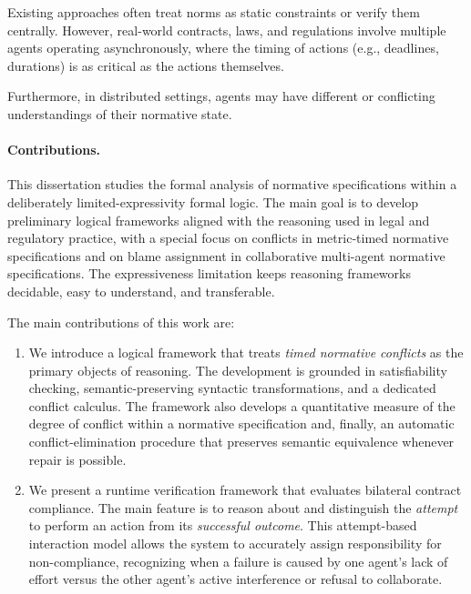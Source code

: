 Existing approaches often treat norms as static constraints or verify them centrally. However, real-world contracts, laws, and regulations involve multiple agents operating asynchronously, where the timing of actions (e.g., deadlines, durations) is as critical as the actions themselves.

Furthermore, in distributed settings, agents may have different or conflicting understandings of their normative state.

\paragraph{Contributions.}
This dissertation studies the formal analysis of normative specifications within a deliberately limited-expressivity formal logic. The main goal is to develop preliminary logical frameworks aligned with the reasoning used in legal and regulatory practice, with a special focus on conflicts in metric-timed normative specifications and on blame assignment in collaborative multi-agent normative specifications. 
The expressiveness limitation keeps reasoning frameworks decidable, easy to understand, and transferable.

The main contributions of this work are:

 \begin{enumerate}[Con1]

   \item We introduce a logical framework that treats \emph{timed normative conflicts} as the primary objects of reasoning. The development is grounded in satisfiability checking, semantic-preserving syntactic transformations, and a dedicated conflict calculus. The framework also develops a quantitative measure of the degree of conflict within a normative specification and, finally, an automatic conflict-elimination procedure that preserves semantic equivalence whenever repair is possible. 

 \item We present a runtime verification framework that evaluates bilateral contract compliance. The main feature is to reason about and distinguish the \emph{attempt} to perform an action from its \emph{successful outcome}. This attempt-based interaction model allows the system to accurately assign responsibility for non-compliance, recognizing when a failure is caused by one agent's lack of effort versus the other agent's active interference or refusal to collaborate.

  \end{enumerate}

